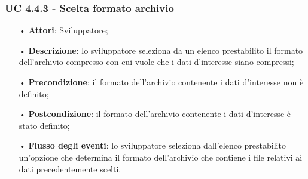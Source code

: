\subsubsection{UC 4.4.3 - Scelta formato archivio}
\begin{itemize}
\item[•]\textbf{Attori}: Sviluppatore;
\item[•]\textbf{Descrizione}: lo sviluppatore seleziona da un elenco prestabilito il formato dell'archivio compresso con cui vuole che i dati d'interesse siano compressi;
\item[•]\textbf{Precondizione}: il formato dell'archivio contenente i dati d'interesse non è definito;
\item[•]\textbf{Postcondizione}: il formato dell'archivio contenente i dati d'interesse è stato definito;
\item[•]\textbf{Flusso degli eventi}: lo sviluppatore seleziona dall'elenco prestabilito un'opzione che determina il formato dell'archivio che contiene i file relativi ai dati precedentemente scelti.
\end{itemize}


